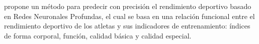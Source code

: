 \cite{zhou2022sports} propone un método para predecir con precisión el rendimiento deportivo basado en Redes Neuronales Profundas, el cual se basa en una relación funcional entre el rendimiento deportivo de los atletas y sus indicadores de entrenamiento: índices de forma corporal, función, calidad básica y calidad especial.
